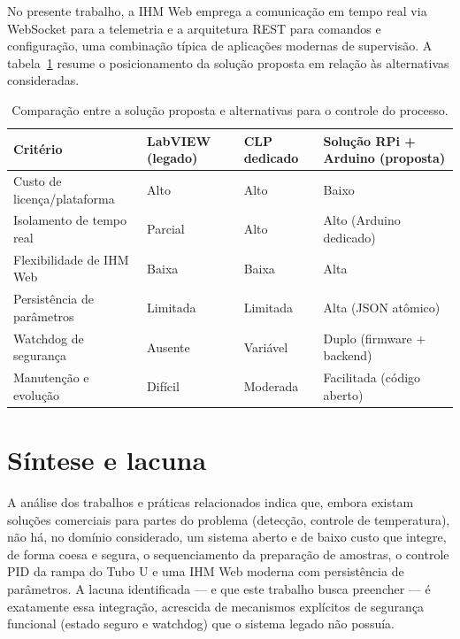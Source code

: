 No presente trabalho, a IHM Web emprega a comunicação em tempo real via
WebSocket \cite{fette2011} para a telemetria e a arquitetura REST para comandos e
configuração, uma combinação típica de aplicações modernas de supervisão. A
tabela~\ref{tab:relacionados} resume o posicionamento da solução proposta em
relação às alternativas consideradas.

\begin{table}[htbp]
\centering
\caption{Comparação entre a solução proposta e alternativas para o controle do processo.}
\label{tab:relacionados}
\begin{tabular}{p{3.4cm}p{3.6cm}p{3.6cm}p{3.6cm}}
\toprule
\textbf{Critério} & \textbf{LabVIEW (legado)} & \textbf{CLP dedicado} & \textbf{Solução RPi + Arduino (proposta)} \\
\midrule
Custo de licença/plataforma & Alto & Alto & Baixo \\
Isolamento de tempo real & Parcial & Alto & Alto (Arduino dedicado) \\
Flexibilidade de IHM Web & Baixa & Baixa & Alta \\
Persistência de parâmetros & Limitada & Limitada & Alta (JSON atômico) \\
Watchdog de segurança & Ausente & Variável & Duplo (firmware + backend) \\
Manutenção e evolução & Difícil & Moderada & Facilitada (código aberto) \\
\bottomrule
\end{tabular}\par\vspace{2pt}{\footnotesize Fonte: elaborada pelo autor.}\end{table}

\section{Síntese e lacuna}

A análise dos trabalhos e práticas relacionados indica que, embora existam
soluções comerciais para partes do problema (detecção, controle de temperatura),
não há, no domínio considerado, um sistema aberto e de baixo custo que integre,
de forma coesa e segura, o sequenciamento da preparação de amostras, o controle
PID da rampa do Tubo U e uma IHM Web moderna com persistência de parâmetros. A
lacuna identificada --- e que este trabalho busca preencher --- é exatamente essa
integração, acrescida de mecanismos explícitos de segurança funcional (estado
seguro e watchdog) que o sistema legado não possuía.
